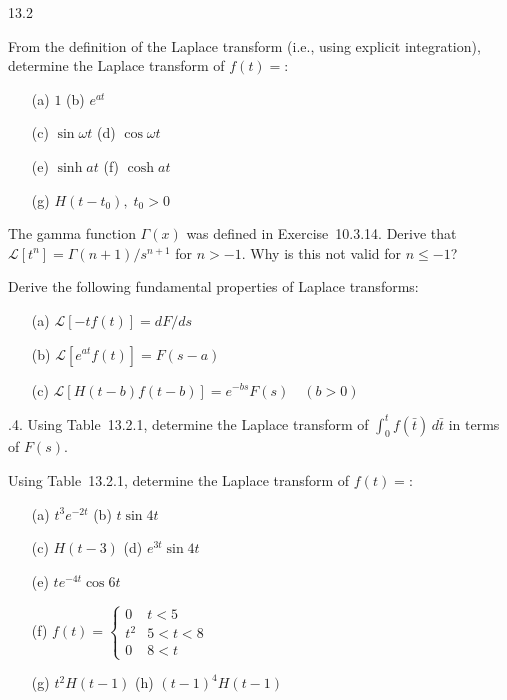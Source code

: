 \begin{exercises}{13.2}

\item From the definition of the Laplace transform (i.e., using explicit integration), determine the Laplace transform of $f(t) =$:
\begin{enumerate}
\item[(a)] $1$ \hfill (b) $e^{at}$
\item[(c)] $\sin\omega t$ \;[\emph{Hint}: $\sin\omega t = \Imag(e^{i\omega t})$.]
      \hfill (d) $\cos\omega t$ \;[\emph{Hint}: $\cos\omega t = \Real(e^{i\omega t})$.]
\item[(e)] $\sinh at$ \hfill (f) $\cosh at$
\item[(g)] $H(t-t_0),\; t_0 > 0$
\end{enumerate}

\item The gamma function $\Gamma(x)$ was defined in Exercise~10.3.14.  Derive that
$\mathcal{L}[t^n] = \Gamma(n+1)/s^{n+1}$ for $n > -1$.  Why is this not valid for $n \le -1$?

\item Derive the following fundamental properties of Laplace transforms:
\begin{enumerate}
\item[(a)] $\mathcal{L}[-tf(t)] = dF/ds$
\item[(b)] $\mathcal{L}[e^{at}f(t)] = F(s-a)$
\item[(c)] $\mathcal{L}[H(t-b)f(t-b)] = e^{-bs}F(s)\quad (b>0)$
\end{enumerate}

\item[\starred 13.2.4.] Using Table~13.2.1, determine the Laplace transform of $\displaystyle\int_0^t f(\bar{t})\,d\bar{t}$ in terms of $F(s)$.

\item Using Table~13.2.1, determine the Laplace transform of $f(t) =$:
\begin{enumerate}
\item[(a)] $t^3 e^{-2t}$ \hfill \starred(b) $t\sin 4t$
\item[(c)] $H(t-3)$ \hfill \starred(d) $e^{3t}\sin 4t$
\item[(e)] $te^{-4t}\cos 6t$
\item[(f)] $f(t) = \begin{cases} 0 & t < 5 \\ t^2 & 5 < t < 8 \\ 0 & 8 < t \end{cases}$
\item[(g)] $t^2 H(t-1)$ \hfill \starred(h) $(t-1)^4 H(t-1)$
\end{enumerate}


\end{exercises}
